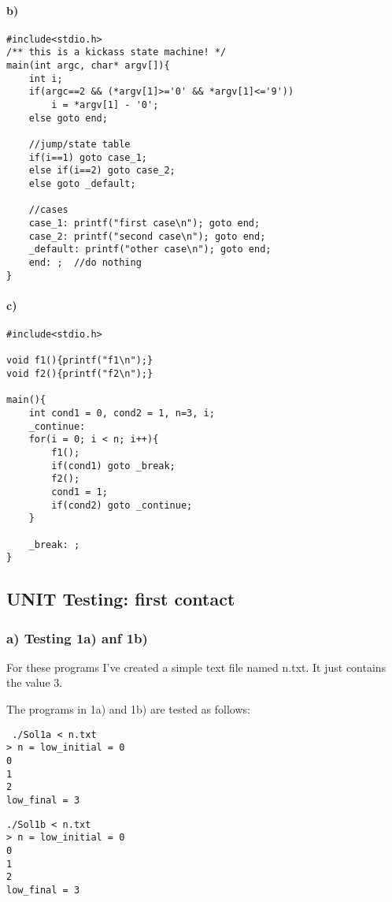\documentclass[12pt]{article}
\begin{document}
\paragraph*{b)} \quad
\begin{lstlisting}
#include<stdio.h>
/** this is a kickass state machine! */
main(int argc, char* argv[]){
	int i;
	if(argc==2 && (*argv[1]>='0' && *argv[1]<='9'))
		i = *argv[1] - '0';
	else goto end; 

	//jump/state table
	if(i==1) goto case_1;
	else if(i==2) goto case_2;
	else goto _default;	

	//cases
	case_1: printf("first case\n"); goto end;
	case_2: printf("second case\n"); goto end;
	_default: printf("other case\n"); goto end;
	end: ;  //do nothing
}
\end{lstlisting}

\paragraph*{c)}
\quad
\begin{lstlisting}
#include<stdio.h>

void f1(){printf("f1\n");}
void f2(){printf("f2\n");}

main(){
	int cond1 = 0, cond2 = 1, n=3, i;
	_continue:
	for(i = 0; i < n; i++){
		f1();
		if(cond1) goto _break;
		f2();
		cond1 = 1;		
		if(cond2) goto _continue;
	}
	
	_break: ;
}
\end{lstlisting}

\subsection*{UNIT Testing: first contact}

\subsubsection*{a) Testing 1a) anf 1b)}
For these programs I've created a simple text file named n.txt.
It just contains the value 3.

The programs in 1a) and 1b) are tested as follows:
\begin{lstlisting}
 ./Sol1a < n.txt 
> n = low_initial = 0
0
1
2
low_final = 3
\end{lstlisting}

\begin{lstlisting}
./Sol1b < n.txt 
> n = low_initial = 0
0
1
2
low_final = 3
\end{lstlisting}
\end{document}
